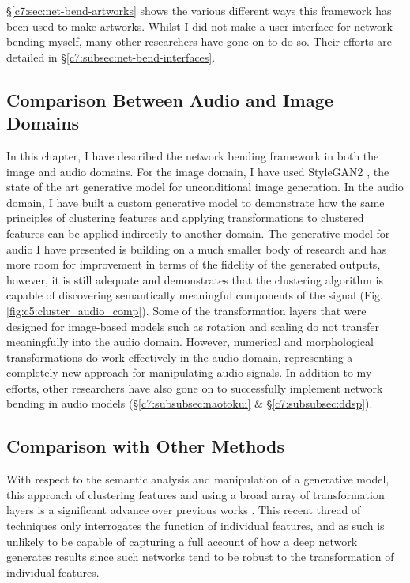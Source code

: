 \S \ref{c7:sec:net-bend-artworks} shows the various different ways this framework has been used to make artworks.
Whilst I did not make a user interface for network bending myself, many other researchers have gone on to do so.
Their efforts are detailed in \S \ref{c7:subsec:net-bend-interfaces}.

\subsection{Comparison Between Audio and Image Domains}

In this chapter, I have described the network bending framework in both the image and audio domains. 
For the image domain, I have used StyleGAN2 \citep{karras2019analyzing}, the state of the art generative model for unconditional image generation. In the audio domain, I have built a custom generative model to demonstrate how the same principles of clustering features and applying transformations to clustered features can be applied indirectly to another domain. 
The generative model for audio I have presented is building on a much smaller body of research and has more room for improvement in terms of the fidelity of the generated outputs, however, it is still adequate and demonstrates that the clustering algorithm is capable of discovering semantically meaningful components of the signal  (Fig. \ref{fig:c5:cluster_audio_comp}). 
Some of the transformation layers that were designed for image-based models such as rotation and scaling do not transfer meaningfully into the audio domain. 
However, numerical and morphological transformations do work effectively in the audio domain, representing a completely new approach for manipulating audio signals. 
In addition to my efforts, other researchers have also gone on to successfully implement network bending in audio models (\S \ref{c7:subsubsec:naotokui} \& \S \ref{c7:subsubsec:ddsp}).

\subsection{Comparison with Other Methods}

With respect to the semantic analysis and manipulation of a generative model, this approach of clustering features and using a broad array of transformation layers is a significant advance over previous works \citep{Bau2017-vg,Bau2018-td,bau2019semantic, Brink2019-gc}. 
This recent thread of techniques only interrogates the function of individual features, and as such is unlikely to be capable of capturing a full account of how a deep network generates results since such networks tend to be robust to the transformation of individual features. 

